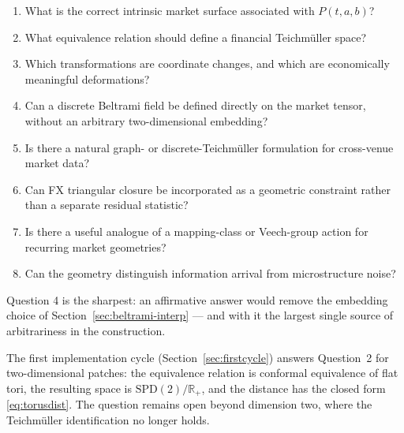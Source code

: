 \documentclass[11pt,a4paper]{article}
\numberwithin{equation}{section}
\begin{document}
\begin{enumerate}
\item What is the correct intrinsic market surface associated with
      $P(t,a,b)$?
\item What equivalence relation should define a financial
      Teichmüller space?
\item Which transformations are coordinate changes, and which are
      economically meaningful deformations?
\item Can a discrete Beltrami field be defined directly on the
      market tensor, without an arbitrary two-dimensional embedding?
\item Is there a natural graph- or discrete-Teichmüller formulation
      for cross-venue market data?
\item Can FX triangular closure be incorporated as a geometric
      constraint rather than a separate residual statistic?
\item Is there a useful analogue of a mapping-class or Veech-group
      action for recurring market geometries?
\item Can the geometry distinguish information arrival from
      microstructure noise?
\end{enumerate}

Question 4 is the sharpest: an affirmative answer would remove the
embedding choice of Section~\ref{sec:beltrami-interp} --- and with
it the largest single source of arbitrariness in the construction.

The first implementation cycle (Section~\ref{sec:firstcycle})
answers Question~2 for two-dimensional patches: the equivalence
relation is conformal equivalence of flat tori, the resulting space
is $\mathrm{SPD}(2)/\mathbb{R}_{+}$, and the distance has the
closed form \eqref{eq:torusdist}. The question remains open beyond
dimension two, where the Teichmüller identification no longer
holds.

\end{document}
